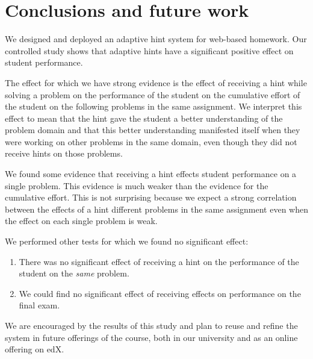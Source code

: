 \documentclass{llncs2e/llncs}
\begin{document}
\section{Conclusions and future work}

We designed and deployed an adaptive hint system for web-based homework. Our controlled study shows that adaptive hints have a significant positive effect on student performance.

The effect for which we have strong evidence is the effect of
receiving a hint while solving a problem on the performance of the
student on the cumulative effort of the student on the following
problems in the same assignment. We interpret this effect to mean that
the hint gave the student a better understanding of the problem domain
and that this better understanding manifested itself when they were
working on other problems in the same domain, even though they did not
receive hints on those problems.

We found some evidence that receiving a hint effects student
performance on a single problem. This evidence is much weaker than the
evidence for the cumulative effort. This is not surprising because we
expect a strong correlation between the effects of a hint different
problems in the same assignment even when the effect on each single
problem is weak.

We performed other tests for which we found no significant effect:
\begin{enumerate}
\item There was no significant effect of receiving a hint on the
  performance of the student on the {\em same} problem.
\item We could find no significant effect of receiving effects on
  performance on the final exam.
\end{enumerate}

We are encouraged by the results of this study and plan to reuse and
refine the system in future offerings of the course, both in our
university and as an online offering on edX.



\end{document}
